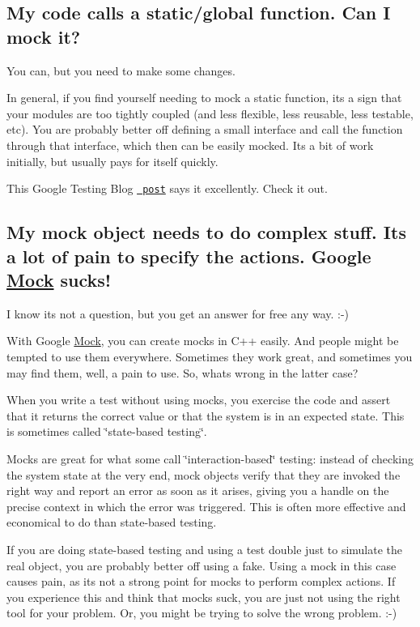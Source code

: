 \subsection*{My code calls a static/global function. Can I mock it?}

You can, but you need to make some changes.

In general, if you find yourself needing to mock a static function, it\textquotesingle{}s a sign that your modules are too tightly coupled (and less flexible, less reusable, less testable, etc). You are probably better off defining a small interface and call the function through that interface, which then can be easily mocked. It\textquotesingle{}s a bit of work initially, but usually pays for itself quickly.

This Google Testing Blog \href{https://testing.googleblog.com/2008/06/defeat-static-cling.html}{\texttt{ post}} says it excellently. Check it out.

\subsection*{My mock object needs to do complex stuff. It\textquotesingle{}s a lot of pain to specify the actions. Google \mbox{\hyperlink{class_mock}{Mock}} sucks!}

I know it\textquotesingle{}s not a question, but you get an answer for free any way. \+:-\/)

With Google \mbox{\hyperlink{class_mock}{Mock}}, you can create mocks in C++ easily. And people might be tempted to use them everywhere. Sometimes they work great, and sometimes you may find them, well, a pain to use. So, what\textquotesingle{}s wrong in the latter case?

When you write a test without using mocks, you exercise the code and assert that it returns the correct value or that the system is in an expected state. This is sometimes called \char`\"{}state-\/based testing\char`\"{}.

Mocks are great for what some call \char`\"{}interaction-\/based\char`\"{} testing\+: instead of checking the system state at the very end, mock objects verify that they are invoked the right way and report an error as soon as it arises, giving you a handle on the precise context in which the error was triggered. This is often more effective and economical to do than state-\/based testing.

If you are doing state-\/based testing and using a test double just to simulate the real object, you are probably better off using a fake. Using a mock in this case causes pain, as it\textquotesingle{}s not a strong point for mocks to perform complex actions. If you experience this and think that mocks suck, you are just not using the right tool for your problem. Or, you might be trying to solve the wrong problem. \+:-\/)

